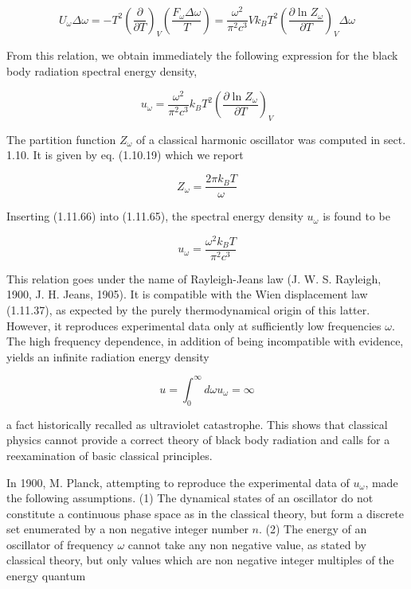 \documentclass{article}
\begin{document}
\begin{equation*}
U_{\omega} \Delta \omega=-T^{2}\left(\frac{\partial}{\partial T}\right)_{V}\left(\frac{F_{\omega} \Delta \omega}{T}\right)=\frac{\omega^{2}}{\pi^{2} c^{3}} V k_{B} T^{2}\left(\frac{\partial \ln Z_{\omega}}{\partial T}\right)_{V} \Delta \omega \tag{1.11.64}
\end{equation*}
 

From this relation, we obtain immediately the following expression for the black body radiation spectral energy density,
 
\begin{equation*}
u_{\omega}=\frac{\omega^{2}}{\pi^{2} c^{3}} k_{B} T^{2}\left(\frac{\partial \ln Z_{\omega}}{\partial T}\right)_{V} \tag{1.11.65}
\end{equation*}
 

The partition function $Z_{\omega}$ of a classical harmonic oscillator was computed in sect. 1.10. It is given by eq. (1.10.19) which we report
 
\begin{equation*}
Z_{\omega}=\frac{2 \pi k_{B} T}{\omega} \tag{1.11.66}
\end{equation*}
 

Inserting (1.11.66) into (1.11.65), the spectral energy density $u_{\omega}$ is found to be
 
\begin{equation*}
u_{\omega}=\frac{\omega^{2} k_{B} T}{\pi^{2} c^{3}} \tag{1.11.67}
\end{equation*}
 

This relation goes under the name of Rayleigh-Jeans law (J. W. S. Rayleigh, 1900, J. H. Jeans, 1905). It is compatible with the Wien displacement law (1.11.37), as expected by the purely thermodynamical origin of this latter. However, it reproduces experimental data only at sufficiently low frequencies $\omega$. The high frequency dependence, in addition of being incompatible with evidence, yields an infinite radiation energy density
 
\begin{equation*}
u=\int_{0}^{\infty} d \omega u_{\omega}=\infty \tag{1.11.68}
\end{equation*}
 
a fact historically recalled as ultraviolet catastrophe. This shows that classical physics cannot provide a correct theory of black body radiation and calls for a reexamination of basic classical principles.

In 1900, M. Planck, attempting to reproduce the experimental data of $u_{\omega}$, made the following assumptions.
(1) The dynamical states of an oscillator do not constitute a continuous phase space as in the classical theory, but form a discrete set enumerated by a non negative integer number $n$.
(2) The energy of an oscillator of frequency $\omega$ cannot take any non negative value, as stated by classical theory, but only values which are non negative integer multiples of the energy quantum
 
\end{document}
